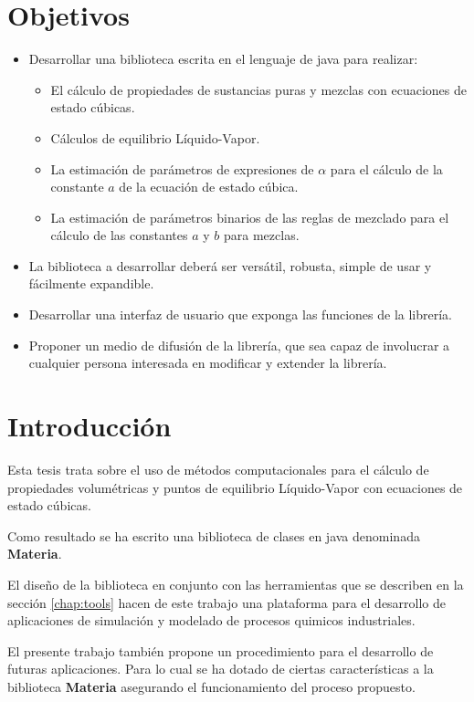 \chapter{Objetivos}

\begin{itemize}
	\item Desarrollar una biblioteca escrita en el lenguaje de java para realizar:
	\begin{itemize}
		\item El cálculo de propiedades de sustancias puras y mezclas con ecuaciones de estado cúbicas.
		\item Cálculos de equilibrio Líquido-Vapor.
		\item La estimación de parámetros de expresiones de $\alpha$ para el cálculo de la constante $a$ de la ecuación de estado cúbica.
		\item La estimación de parámetros binarios de las reglas de mezclado para el cálculo de las constantes $a$ y $b$ para mezclas.
	\end{itemize}
	\item La biblioteca a desarrollar deberá ser versátil, robusta, simple de usar y fácilmente expandible.
	\item Desarrollar una interfaz de usuario que exponga las funciones de la librería.
	\item Proponer un medio de difusión de la librería, que sea capaz de involucrar a cualquier persona interesada en modificar y extender la librería.
\end{itemize}

\chapter{Introducción}

	Esta tesis trata sobre el uso de métodos computacionales para el cálculo de propiedades volumétricas y puntos de equilibrio Líquido-Vapor con ecuaciones de estado cúbicas. 

	Como resultado se ha escrito una biblioteca de clases en java denominada \textbf{Materia}.

	El diseño de la biblioteca en conjunto con las herramientas que se describen en la sección \ref{chap:tools} hacen de este trabajo una plataforma para el desarrollo de aplicaciones de simulación y modelado de procesos quimicos industriales.

	El presente trabajo también propone un procedimiento para el desarrollo de futuras aplicaciones. Para lo cual se ha dotado de ciertas características a la biblioteca \textbf{Materia} asegurando el funcionamiento del proceso propuesto.

